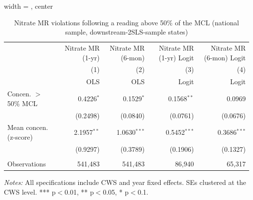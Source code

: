 
\begin{table}[htbp]
\caption{Nitrate MR violations following a reading above 50\% of the MCL (national sample, downstream-2SLS-sample states)}\label{tab:mr_concentration_lag_national_downstream_states}
\centering
\begin{adjustbox}{width = \textwidth, center}
   \begin{tabular}{lrrrr}
      \toprule    
                      & Nitrate MR (1-yr) & Nitrate MR (6-mon)  & Nitrate MR (1-yr) Logit & Nitrate MR (6-mon) Logit \\   
                      & (1)               & (2)                 & (3)                     & (4)\\  
                      &  OLS              & OLS                 & Logit                   & Logit\\  
      \midrule 
      Concen. $>$ 50\% MCL       & 0.4226$^{*}$      & 0.1529$^{*}$        & 0.1568$^{**}$           & 0.0969\\   
                      & (0.2498)          & (0.0840)            & (0.0761)                & (0.0676)\\   
      Mean concen. (z-score)   & 2.1957$^{**}$     & 1.0630$^{***}$      & 0.5452$^{***}$          & 0.3686$^{***}$\\   
                      & (0.9297)          & (0.3789)            & (0.1906)                & (0.1327)\\   
       \\
      Observations    & 541,483           & 541,483             & 86,940                  & 65,317\\  
      \bottomrule
   \end{tabular}
\end{adjustbox}
{\tiny\linespread{1}\selectfont \par \raggedright \textit{Notes:} All specifications include CWS and year fixed effects. SEs clustered at the CWS level. *** p$<$0.01, ** p$<$0.05, * p$<$0.1.}
\end{table}

